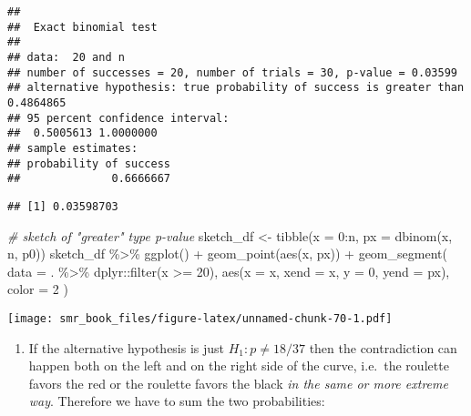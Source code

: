 \documentclass[
  oneside]{book}
\newenvironment{Shaded}{\begin{snugshade}}{\end{snugshade}}
\newcommand{\AttributeTok}[1]{\textcolor[rgb]{0.77,0.63,0.00}{#1}}
\newcommand{\CommentTok}[1]{\textcolor[rgb]{0.56,0.35,0.01}{\textit{#1}}}
\newcommand{\DecValTok}[1]{\textcolor[rgb]{0.00,0.00,0.81}{#1}}
\newcommand{\FunctionTok}[1]{\textcolor[rgb]{0.00,0.00,0.00}{#1}}
\newcommand{\NormalTok}[1]{#1}
\newcommand{\OtherTok}[1]{\textcolor[rgb]{0.56,0.35,0.01}{#1}}
\newcommand{\SpecialCharTok}[1]{\textcolor[rgb]{0.00,0.00,0.00}{#1}}
\providecommand{\tightlist}{%
  \setlength{\itemsep}{0pt}\setlength{\parskip}{0pt}}
\begin{document}
\begin{verbatim}
## 
##  Exact binomial test
## 
## data:  20 and n
## number of successes = 20, number of trials = 30, p-value = 0.03599
## alternative hypothesis: true probability of success is greater than 0.4864865
## 95 percent confidence interval:
##  0.5005613 1.0000000
## sample estimates:
## probability of success 
##              0.6666667
\end{verbatim}

\begin{Shaded}
\end{Shaded}

\begin{verbatim}
## [1] 0.03598703
\end{verbatim}

\begin{Shaded}
\begin{Highlighting}[]
\CommentTok{\# sketch of "greater" type p{-}value}
\NormalTok{sketch\_df }\OtherTok{\textless{}{-}} \FunctionTok{tibble}\NormalTok{(}\AttributeTok{x =} \DecValTok{0}\SpecialCharTok{:}\NormalTok{n, }\AttributeTok{px =} \FunctionTok{dbinom}\NormalTok{(x, n, p0))}
\NormalTok{sketch\_df }\SpecialCharTok{\%\textgreater{}\%}
  \FunctionTok{ggplot}\NormalTok{() }\SpecialCharTok{+}
  \FunctionTok{geom\_point}\NormalTok{(}\FunctionTok{aes}\NormalTok{(x, px)) }\SpecialCharTok{+}
  \FunctionTok{geom\_segment}\NormalTok{(}
    \AttributeTok{data =}\NormalTok{ . }\SpecialCharTok{\%\textgreater{}\%}\NormalTok{ dplyr}\SpecialCharTok{::}\FunctionTok{filter}\NormalTok{(x }\SpecialCharTok{\textgreater{}=} \DecValTok{20}\NormalTok{),}
    \FunctionTok{aes}\NormalTok{(}\AttributeTok{x =}\NormalTok{ x, }\AttributeTok{xend =}\NormalTok{ x, }\AttributeTok{y =} \DecValTok{0}\NormalTok{, }\AttributeTok{yend =}\NormalTok{ px), }\AttributeTok{color =} \DecValTok{2}
\NormalTok{  )}
\end{Highlighting}
\end{Shaded}

\texttt{[image: smr\_book\_files/figure-latex/unnamed-chunk-70-1.pdf]}

\begin{enumerate}
\def\labelenumi{\alph{enumi}.}
\setcounter{enumi}{1}
\tightlist
\item
  If the alternative hypothesis is just \(H_1: p \neq 18/37\) then the
  contradiction can happen both on the left and on the right side of the curve,
  i.e.~the roulette favors the red or the roulette favors the black \emph{in the
  same or more extreme way}.
  Therefore we have to sum the two probabilities:
\end{enumerate}
\end{document}
